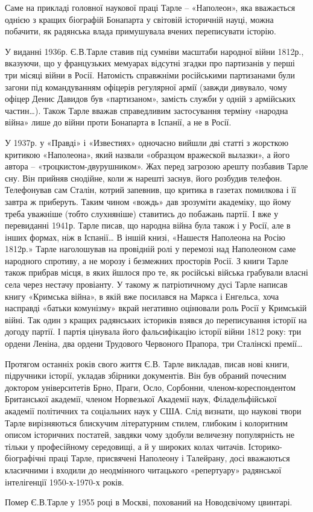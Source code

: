 Саме на прикладі головної наукової праці Тарле – «Наполеон», яка вважається
однією з кращих біографій Бонапарта у світовій історичній науці, можна
побачити, як радянська влада примушувала вчених переписувати історію. 

У виданні 1936р. Є.В.Тарле ставив під сумніви масштаби народної війни 1812р.,
вказуючи, що у французьких мемуарах відсутні згадки про партизанів у перші три
місяці війни в Росії. Натомість справжніми російськими партизанами були загони
під командуванням офіцерів регулярної армії (завжди дивувало, чому офіцер Денис
Давидов був «партизаном», замість служби у одній з армійських частин…). Також
Тарле вважав справедливим застосування терміну «народна війна» лише до війни
проти Бонапарта в Іспанії, а не в Росії. 

У 1937р. у «Правді» і «Известиях» одночасно вийшли дві статті з жорсткою
критикою «Наполеона», який назвали «образцом вражеской вылазки», а його автора
– «троцкистом-двурушником». Жах перед загрозою арешту позбавив Тарле сну. Він
прийняв снодійне, коли ж нарешті заснув, його розбудив телефон. Телефонував сам
Сталін, котрий запевнив, що критика в газетах помилкова і її завтра ж
приберуть. Таким чином «вождь» дав зрозуміти академіку, що йому треба уважніше
(тобто слухняніше) ставитись до побажань партії. І вже у перевиданні 1941р.
Тарле писав, що народна війна була також і у Росії, але в інших формах, ніж в
Іспанії… В іншій книзі, «Нашестя Наполеона на Росію 1812р.» Тарле наголошував
на провідній ролі у перемозі над Наполеоном саме народного спротиву, а не
морозу і безмежних просторів Росії. З книги Тарле також прибрав місця, в яких
йшлося про те, як російські війська грабували власні села через нестачу
провіанту. У такому ж патріотичному дусі Тарле написав книгу «Кримська війна»,
в якій вже посилався на Маркса і Енгельса, хоча насправді «батьки комунізму»
вкрай негативно оцінювали роль Росії у Кримській війні. Так один з кращих
радянських істориків взявся до переписування історії на догоду партії. І партія
цінувала його фальсифікацію історії війни 1812 року: три ордени Леніна, два
ордени Трудового Червоного Прапора, три Сталінскі премії…

Протягом останніх років свого життя Є.В. Тарле викладав, писав нові книги,
підручники історії, укладав збірники документів. Він був обраний почесним
доктором університетів Брно, Праги, Осло, Сорбонни, членом-кореспондентом
Британської академії, членом Норвезької Академії наук, Філадельфійської
академії політичних та соціальних наук у США. Слід визнати, що наукові твори
Тарле вирізняються блискучим літературним стилем, глибоким і колоритним описом
історичних постатей, завдяки чому здобули величезну популярність не тільки у
професійному середовищі, а й у широких колах читачів. Історико-біографічні
праці Тарле, присвячені Наполеону і Талейрану, досі вважаються класичними і
входили до неодмінного читацького «репертуару» радянської інтелігенції
1950-х-1970-х років.  

Помер Є.В.Тарле у 1955 році в Москві, похований на Новодєвічому цвинтарі.
